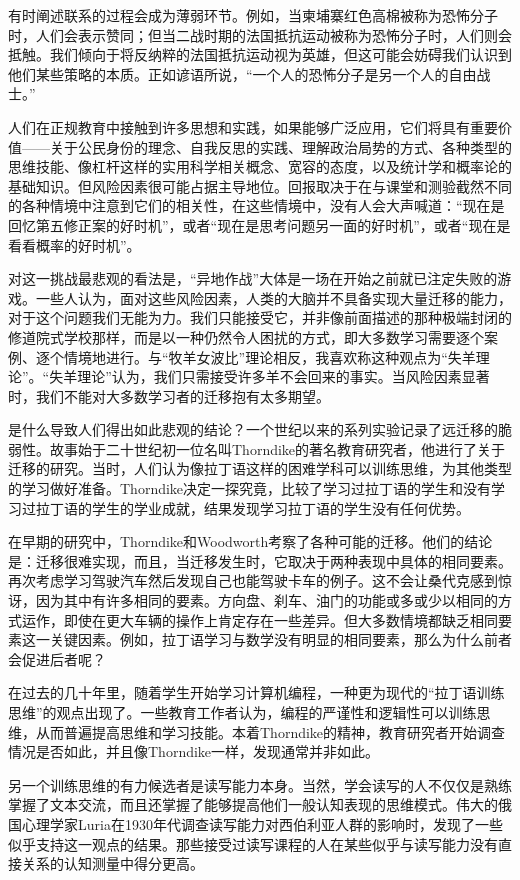 有时阐述联系的过程会成为薄弱环节。例如，当柬埔寨红色高棉被称为恐怖分子时，人们会表示赞同；但当二战时期的法国抵抗运动被称为恐怖分子时，人们则会抵触。我们倾向于将反纳粹的法国抵抗运动视为英雄，但这可能会妨碍我们认识到他们某些策略的本质。正如谚语所说，“一个人的恐怖分子是另一个人的自由战士。”

人们在正规教育中接触到许多思想和实践，如果能够广泛应用，它们将具有重要价值——关于公民身份的理念、自我反思的实践、理解政治局势的方式、各种类型的思维技能、像杠杆这样的实用科学相关概念、宽容的态度，以及统计学和概率论的基础知识。但风险因素很可能占据主导地位。回报取决于在与课堂和测验截然不同的各种情境中注意到它们的相关性，在这些情境中，没有人会大声喊道：“现在是回忆第五修正案的好时机”，或者“现在是思考问题另一面的好时机”，或者“现在是看看概率的好时机”。

对这一挑战最悲观的看法是，“异地作战”大体是一场在开始之前就已注定失败的游戏。一些人认为，面对这些风险因素，人类的大脑并不具备实现大量迁移的能力，对于这个问题我们无能为力。我们只能接受它，并非像前面描述的那种极端封闭的修道院式学校那样，而是以一种仍然令人困扰的方式，即大多数学习需要逐个案例、逐个情境地进行。与“牧羊女波比”理论相反，我喜欢称这种观点为“失羊理论”。“失羊理论”认为，我们只需接受许多羊不会回来的事实。当风险因素显著时，我们不能对大多数学习者的迁移抱有太多期望。

是什么导致人们得出如此悲观的结论？一个世纪以来的系列实验记录了远迁移的脆弱性。故事始于二十世纪初一位名叫Thorndike的著名教育研究者，他进行了关于迁移的研究。当时，人们认为像拉丁语这样的困难学科可以训练思维，为其他类型的学习做好准备。Thorndike决定一探究竟，比较了学习过拉丁语的学生和没有学习过拉丁语的学生的学业成就，结果发现学习拉丁语的学生没有任何优势。

在早期的研究中，Thorndike和Woodworth考察了各种可能的迁移。他们的结论是：迁移很难实现，而且，当迁移发生时，它取决于两种表现中具体的相同要素。再次考虑学习驾驶汽车然后发现自己也能驾驶卡车的例子。这不会让桑代克感到惊讶，因为其中有许多相同的要素。方向盘、刹车、油门的功能或多或少以相同的方式运作，即使在更大车辆的操作上肯定存在一些差异。但大多数情境都缺乏相同要素这一关键因素。例如，拉丁语学习与数学没有明显的相同要素，那么为什么前者会促进后者呢？

在过去的几十年里，随着学生开始学习计算机编程，一种更为现代的“拉丁语训练思维”的观点出现了。一些教育工作者认为，编程的严谨性和逻辑性可以训练思维，从而普遍提高思维和学习技能。本着Thorndike的精神，教育研究者开始调查情况是否如此，并且像Thorndike一样，发现通常并非如此。

另一个训练思维的有力候选者是读写能力本身。当然，学会读写的人不仅仅是熟练掌握了文本交流，而且还掌握了能够提高他们一般认知表现的思维模式。伟大的俄国心理学家Luria在1930年代调查读写能力对西伯利亚人群的影响时，发现了一些似乎支持这一观点的结果。那些接受过读写课程的人在某些似乎与读写能力没有直接关系的认知测量中得分更高。

